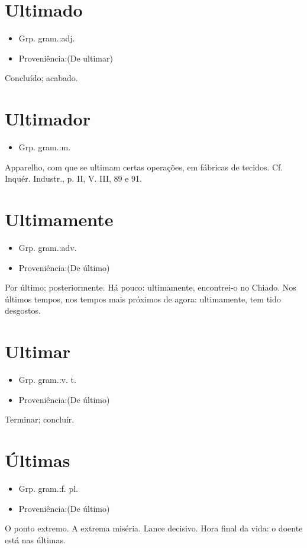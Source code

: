 \documentclass{article}
\begin{document}
\section{Ultimado}
\begin{itemize}
\item {Grp. gram.:adj.}
\end{itemize}
\begin{itemize}
\item {Proveniência:(De \textunderscore ultimar\textunderscore )}
\end{itemize}
Concluído; acabado.
\section{Ultimador}
\begin{itemize}
\item {Grp. gram.:m.}
\end{itemize}
Apparelho, com que se ultimam certas operações, em fábricas de tecidos. Cf. \textunderscore Inquér. Industr.\textunderscore , p. II, V. III, 89 e 91.
\section{Ultimamente}
\begin{itemize}
\item {Grp. gram.:adv.}
\end{itemize}
\begin{itemize}
\item {Proveniência:(De \textunderscore último\textunderscore )}
\end{itemize}
Por último; posteriormente.
Há pouco: \textunderscore ultimamente, encontrei-o no Chiado\textunderscore .
Nos últimos tempos, nos tempos mais próximos de agora: \textunderscore ultimamente, tem tido desgostos\textunderscore .
\section{Ultimar}
\begin{itemize}
\item {Grp. gram.:v. t.}
\end{itemize}
\begin{itemize}
\item {Proveniência:(De \textunderscore último\textunderscore )}
\end{itemize}
Terminar; concluír.
\section{Últimas}
\begin{itemize}
\item {Grp. gram.:f. pl.}
\end{itemize}
\begin{itemize}
\item {Proveniência:(De \textunderscore último\textunderscore )}
\end{itemize}
O ponto extremo.
A extrema miséria.
Lance decisivo.
Hora final da vida: \textunderscore o doente está nas últimas\textunderscore .
\end{document}
